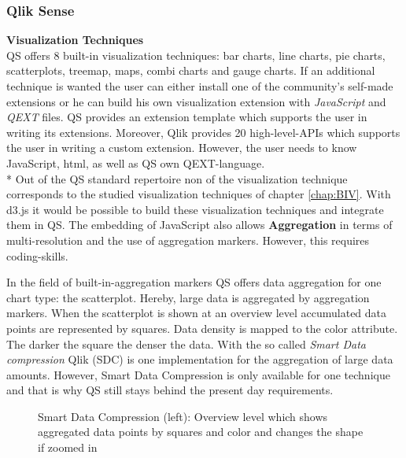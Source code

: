 \subsubsection*{Qlik Sense}

\textbf{Visualization Techniques}\\
QS offers 8 built-in visualization techniques: bar charts, line charts, pie charts, scatterplots, treemap, maps, combi charts and gauge charts. If an additional technique is wanted the user can either install one of the community's self-made extensions or he can build his own visualization extension with \textit{JavaScript} and \textit{QEXT} files\cite{qlikWorkbench}. QS provides an extension template which supports the user in writing its extensions. Moreover, Qlik provides 20 high-level-APIs which supports the user in writing a custom extension. However, the user needs to know JavaScript, html\cite{qlikVisExtensions}, as well as QS own QEXT-language. \\*
Out of the QS standard repertoire non of the visualization technique corresponds to the studied visualization techniques of chapter \ref{chap:BIV}. With d3.js it would be possible to build these visualization techniques and integrate them in QS. 
The embedding of JavaScript also allows \textbf{Aggregation} in terms of multi-resolution and the use of aggregation markers. However, this requires coding-skills. 

In the field of built-in-aggregation markers QS offers data aggregation for one chart type: the scatterplot. Hereby, large data is aggregated by aggregation markers. When the scatterplot is shown at an overview level accumulated data points are represented by squares. Data density is mapped to the color attribute.  The darker the square the denser the data\cite{qlikScatter}. With the so called \textit{Smart Data compression} Qlik (SDC) is one implementation for the aggregation of large data amounts. However, Smart Data Compression is only available for one technique and that is why QS still stays behind the present day requirements.


\begin{figure}[H]
    \centering
    \caption{Smart Data Compression (left): Overview level which shows aggregated data points by squares and color and changes the shape if zoomed in}
    \label{fig:smartdatacompression}
\end{figure}

